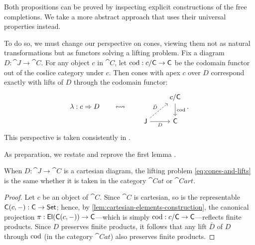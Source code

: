 \documentclass[11pt]{article}
\numberwithin{equation}{section}
\begin{document}
Both propositions can be proved by inspecting explicit constructions of the free
completions. We take a more abstract approach that uses their universal
properties instead.

To do so, we must change our perspective on cones, viewing them not as natural
transformations but as functors solving a lifting problem. Fix a diagram
$D: \cat{J} \to \cat{C}$. For any object $c$ in $\cat{C}$, let
$\operatorname{cod}: c/\mathsf{C} \to \mathsf{C}$ be the codomain functor out of the coslice category
under $c$. Then cones with apex $c$ over $D$ correspond exactly with lifts of
$D$ through the codomain functor:
\begin{equation} \label{eq:cones-and-lifts}
  \lambda: c \To D
  \qquad\leftrightsquigarrow\qquad
  \begin{tikzcd}
    & {c/\cat{C}} \\
    {\cat{J}} & {\cat{C}}
    \arrow["\cod", from=1-2, to=2-2]
    \arrow["{\bar D}", dashed, from=2-1, to=1-2]
    \arrow["D"', from=2-1, to=2-2]
  \end{tikzcd}.
\end{equation}
This perspective is taken consistently in \cite[esp.\ \S{2}]{patterson2023}.

As preparation, we restate and reprove the first lemma \cite[cf.][\mbox{Lemma
  6.7}]{patterson2023}.

\begin{lemma}
  \label{lem:lifts-cartesian-diagram}
  When $D: \cat{J} \to \cat{C}$ is a cartesian diagram, the lifting problem
  \eqref{eq:cones-and-lifts} is the same whether it is taken in the category
  $\cat{Cat}$ or $\cat{Cart}$.
\end{lemma}
\begin{proof}
  Let $c$ be an object of $\cat{C}$. Since $\cat{C}$ is cartesian, so is the
  representable $\mathsf{C}(c,-): \mathsf{C} \to \mathsf{Set}$; hence, by
  \cref{lem:cartesian-elements-construction}, the canonical projection
  $\pi: \mathop{\mathsf{El}}(\mathsf{C}(c,-)) \to \mathsf{C}$---which is simply
  $\operatorname{cod}: c/\mathsf{C} \to \mathsf{C}$---reflects finite products. Since $D$ preserves
  finite products, it follows that any lift $\bar D$ of $D$ through $\operatorname{cod}$ (in
  the category $\cat{Cat}$) also preserves finite products.
\end{proof}
\end{document}

